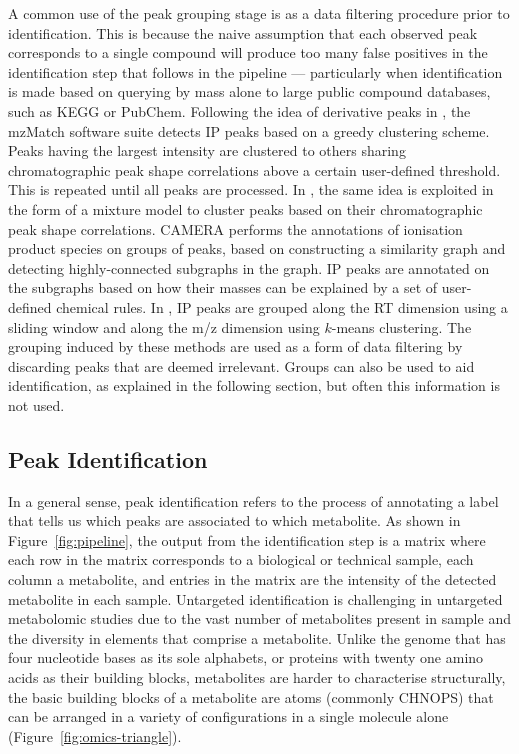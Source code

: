 A common use of the peak grouping stage is as a data filtering procedure prior to identification. This is because the naive assumption that each observed peak corresponds to a single compound will produce too many false positives in the identification step that follows in the pipeline --- particularly when identification is made based on querying by mass alone to large public compound databases, such as KEGG or PubChem. Following the idea of derivative peaks in \cite{Scheltema2009a}, the mzMatch software suite \cite{Scheltema2011} detects IP peaks based on a greedy clustering scheme. Peaks having the largest intensity are clustered to others sharing chromatographic peak shape correlations above a certain user-defined threshold. This is repeated until all peaks are processed. In \cite{Rogers2012}, the same idea is exploited in the form of a mixture model to cluster peaks based on their chromatographic peak shape correlations. CAMERA \cite{Kuhl2012} performs the annotations of ionisation product species on groups of peaks, based on constructing a similarity graph and detecting highly-connected subgraphs in the graph. IP peaks are annotated on the subgraphs based on how their masses can be explained by a set of user-defined chemical rules. In \cite{Lee2013}, IP peaks are grouped along the RT dimension using a sliding window and along the m/z dimension using $k$-means clustering. The grouping induced by these methods are used as a form of data filtering by discarding peaks that are deemed irrelevant. Groups can also be used to aid identification, as explained in the following section, but often this information is not used.


\subsection{Peak Identification\label{sub:identification-background}}

In a general sense, peak identification refers to the process of annotating a label that tells us which peaks are associated to which metabolite. As shown in Figure~\ref{fig:pipeline}, the output from the identification step is a matrix where each row in the matrix corresponds to a biological or technical sample, each column a metabolite, and entries in the matrix are the intensity of the detected metabolite in each sample. Untargeted identification is challenging in untargeted metabolomic studies due to the vast number of metabolites present in sample and the diversity in elements that comprise a metabolite. Unlike the genome that has four nucleotide bases as its sole alphabets, or proteins with twenty one amino acids as their building blocks, metabolites are harder to characterise structurally, the basic building blocks of a metabolite are atoms (commonly CHNOPS) that can be arranged in a variety of configurations in a single molecule alone (Figure~\ref{fig:omics-triangle}). 

